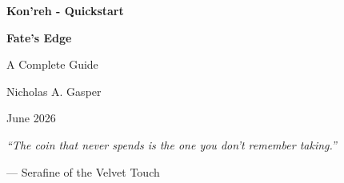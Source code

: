 \begin{titlepage}
\centering
\vspace*{1cm}

{\Huge\bfseries Kon'reh - Quickstart\par}
\vspace{0.3cm}
{\Large\bfseries Fate's Edge\par}
\vspace{0.5cm}
{\large A Complete Guide\par}
\vspace{2cm}

{\large Nicholas A. Gasper\par}
\vspace{0.3cm}
{\large June 2026\par}

\vfill
{\large \textit{``The coin that never spends is the one you don't remember taking.''}\par}
\vspace{0.2cm}
{\large --- Serafine of the Velvet Touch\par}

\end{titlepage}
